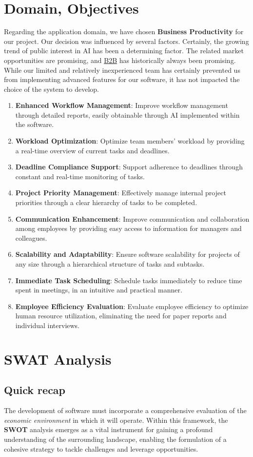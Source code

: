 \documentclass{article}
\begin{document}
\section{Domain, Objectives}
Regarding the application domain, we have chosen \textbf{Business Productivity} for our project. 
Our decision was influenced by several factors. Certainly, the growing trend of public interest in AI has been a determining factor. The related market opportunities are promising, and \underline{B2B} has historically always been promising. 
While our limited and relatively inexperienced team has certainly prevented us from implementing advanced features for our software, it has not impacted the choice of the system to develop.
\begin{enumerate}
\item \textbf{Enhanced Workflow Management}: Improve workflow management through detailed reports, easily obtainable through AI implemented within the software.
\item \textbf{Workload Optimization}: Optimize team members' workload by providing a real-time overview of current tasks and deadlines.
\item \textbf{Deadline Compliance Support}: Support adherence to deadlines through constant and real-time monitoring of tasks.
\item \textbf{Project Priority Management}: Effectively manage internal project priorities through a clear hierarchy of tasks to be completed.
\item \textbf{Communication Enhancement}: Improve communication and collaboration among employees by providing easy access to information for managers and colleagues.
\item \textbf{Scalability and Adaptability}: Ensure software scalability for projects of any size through a hierarchical structure of tasks and subtasks.
\item \textbf{Immediate Task Scheduling}: Schedule tasks immediately to reduce time spent in meetings, in an intuitive and practical manner.
\item \textbf{Employee Efficiency Evaluation}: Evaluate employee efficiency to optimize human resource utilization, eliminating the need for paper reports and individual interviews.
\end{enumerate}

\section{SWAT Analysis}
\subsection{Quick recap}
The development of software must incorporate a comprehensive evaluation of the \textit{economic environment} in which it will operate.
Within this framework, the \textbf{SWOT} analysis emerges as a vital instrument for gaining a profound understanding of the surrounding landscape, enabling the formulation of a cohesive strategy to tackle challenges and leverage opportunities.
\end{document}
